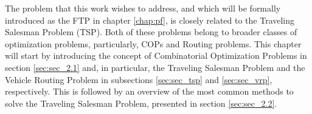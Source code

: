 
The problem that this work wishes to address, and which will be formally introduced as the \ac{FTP} in chapter \ref{chap:pf}, is closely related to the Traveling Salesman Problem (TSP). Both of these problems belong to broader classes of optimization problems, particularly, \acp{COP} and Routing problems. This chapter will start by introducing the concept of Combinatorial Optimization Problems in section \ref{sec:sec_2.1} and, in particular, the Traveling Salesman Problem  and the Vehicle Routing Problem in subsections \ref{sec:sec_tsp} and \ref{sec:sec_vrp}, respectively. This is followed by an overview of the most common methods to solve the Traveling Salesman Problem, presented in section \ref{sec:sec_2.2}.
